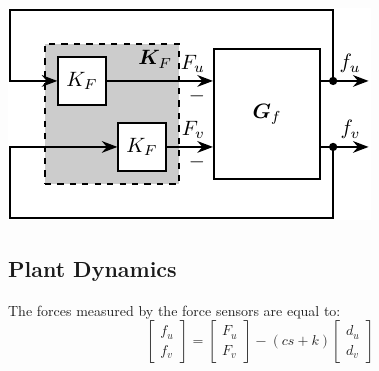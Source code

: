 \documentclass{ISMA_USD2020}
\begin{document}
\begin{minipage}[t]{0.40\linewidth}
\begin{center}
\includegraphics[scale=1]{figs/control_diagram_iff.pdf}
\end{center}
\end{minipage}

\subsection{Plant Dynamics}
\label{sec:orge8dea8f}
The forces measured by the force sensors are equal to:
\begin{equation}
\label{eq:measured_force}
  \begin{bmatrix} f_{u} \\ f_{v} \end{bmatrix} =
  \begin{bmatrix} F_u \\ F_v \end{bmatrix} - (c s + k)
  \begin{bmatrix} d_u \\ d_v \end{bmatrix}
\end{equation}
\end{document}

